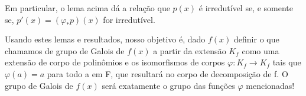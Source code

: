 \documentclass[../algebraIII_notes.tex]{subfiles}
\begin{document}
\begin{tcolorbox}[
		skin=enhanced,
		title=Observação,
		fonttitle=\bfseries,
		colframe=black,
		colbacktitle=cyan!75!white,
		colback=cyan!15,
		colbacklower=black,
		coltitle=black,
		drop fuzzy shadow,
	]
	Em particular, o lema acima dá a relação que \(p(x)\) é irredutível se, e somente se, \(p'(x)=(\varphi_{*}p)(x)\) for irredutível.
\end{tcolorbox}
Usando estes lemas e resultados, nosso objetivo é, dado \(f(x)\) definir o que chamamos de grupo de Galois de \(f(x)\) a partir da extensão \(K_{f}\) como uma extensão de corpo de polinômios e os isomorfismos de corpos \(\varphi :K_{f}\rightarrow K_{f}\) tais que \(\varphi (a)=a\) para todo a em F, que resultará no corpo de decomposição de f.
O grupo de Galois de \(f(x)\) será exatamente o grupo das funções \(\varphi \) mencionadas!
\end{document}
